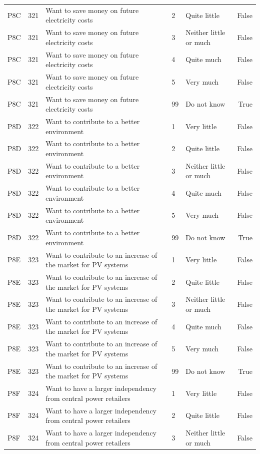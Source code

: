 \begin{tabular}{lrlllr}
P8C & 321 & Want to save money on future electricity costs & 2 & Quite little & False \\
P8C & 321 & Want to save money on future electricity costs & 3 & Neither little or much & False \\
P8C & 321 & Want to save money on future electricity costs & 4 & Quite much & False \\
P8C & 321 & Want to save money on future electricity costs & 5 & Very much & False \\
P8C & 321 & Want to save money on future electricity costs & 99 & Do not know & True \\
P8D & 322 & Want to contribute to a better environment & 1 & Very little & False \\
P8D & 322 & Want to contribute to a better environment & 2 & Quite little & False \\
P8D & 322 & Want to contribute to a better environment & 3 & Neither little or much & False \\
P8D & 322 & Want to contribute to a better environment & 4 & Quite much & False \\
P8D & 322 & Want to contribute to a better environment & 5 & Very much & False \\
P8D & 322 & Want to contribute to a better environment & 99 & Do not know & True \\
P8E & 323 & Want to contribute to an increase of the market for PV systems & 1 & Very little & False \\
P8E & 323 & Want to contribute to an increase of the market for PV systems & 2 & Quite little & False \\
P8E & 323 & Want to contribute to an increase of the market for PV systems & 3 & Neither little or much & False \\
P8E & 323 & Want to contribute to an increase of the market for PV systems & 4 & Quite much & False \\
P8E & 323 & Want to contribute to an increase of the market for PV systems & 5 & Very much & False \\
P8E & 323 & Want to contribute to an increase of the market for PV systems & 99 & Do not know & True \\
P8F & 324 & Want to have a larger independency from central power retailers & 1 & Very little & False \\
P8F & 324 & Want to have a larger independency from central power retailers & 2 & Quite little & False \\
P8F & 324 & Want to have a larger independency from central power retailers & 3 & Neither little or much & False \\

\end{tabular}

